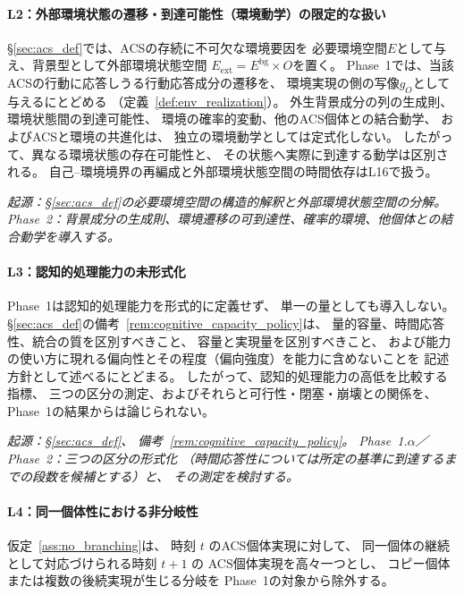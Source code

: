 \paragraph{L2：外部環境状態の遷移・到達可能性（環境動学）の限定的な扱い}
\label{lim:L2}
\S\ref{sec:acs_def}では、ACSの存続に不可欠な環境要因を
必要環境空間$E$として与え、背景型として外部環境状態空間
$E_{\mathrm{ext}}=E^{\mathrm{bg}}\times O$を置く。
Phase~1では、当該ACSの行動に応答しうる行動応答成分の遷移を、
環境実現の側の写像$g_O$として与えるにとどめる
（定義~\ref{def:env_realization}）。
外生背景成分の列の生成則、環境状態間の到達可能性、
環境の確率的変動、他のACS個体との結合動学、
およびACSと環境の共進化は、
独立の環境動学としては定式化しない。
したがって、異なる環境状態の存在可能性と、
その状態へ実際に到達する動学は区別される。
自己--環境境界の再編成と外部環境状態空間の時間依存はL16で扱う。

\medskip
\noindent\textit{起源：\S\ref{sec:acs_def}の必要環境空間の構造的解釈と外部環境状態空間の分解。
Phase~2：背景成分の生成則、環境遷移の可到達性、確率的環境、他個体との結合動学を導入する。}

\paragraph{L3：認知的処理能力の未形式化}
\label{lim:L3}
Phase~1は認知的処理能力を形式的に定義せず、
単一の量としても導入しない。
\S\ref{sec:acs_def}の備考~\ref{rem:cognitive_capacity_policy}は、
量的容量、時間応答性、統合の質を区別すべきこと、
容量と実現量を区別すべきこと、
および能力の使い方に現れる偏向性とその程度（偏向強度）を能力に含めないことを
記述方針として述べるにとどまる。
したがって、認知的処理能力の高低を比較する指標、
三つの区分の測定、およびそれらと可行性・閉塞・崩壊との関係を、
Phase~1の結果からは論じられない。

\medskip
\noindent\textit{起源：\S\ref{sec:acs_def}、
備考~\ref{rem:cognitive_capacity_policy}。
Phase~1.$\alpha$／Phase~2：三つの区分の形式化
（時間応答性については所定の基準に到達するまでの段数を候補とする）と、
その測定を検討する。}

\paragraph{L4：同一個体性における非分岐性}
\label{lim:L4}
仮定~\ref{ass:no_branching}は、
時刻 $t$ のACS個体実現に対して、
同一個体の継続として対応づけられる時刻 $t+1$ の
ACS個体実現を高々一つとし、
コピー個体または複数の後続実現が生じる分岐を
Phase~1の対象から除外する。

